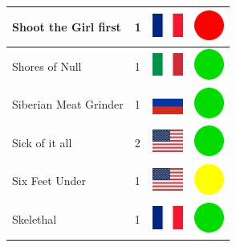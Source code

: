 \documentclass[12pt, a4paper, twoside]{report}
\begin{document}
\begin{center}
\begin{longtable}{|p{5cm}|p{2cm}|p{2cm}|p{2cm}|}
			Shoot the Girl first & 1 & \includegraphics[width=1cm]{4x3/fr} & \includegraphics[width=1cm]{likes/n} \\ \hline
			Shores of Null & 1 & \includegraphics[width=1cm]{4x3/it} & \includegraphics[width=1cm]{likes/y} \\ \hline
			Siberian Meat Grinder & 1 & \includegraphics[width=1cm]{4x3/ru} & \includegraphics[width=1cm]{likes/y} \\ \hline
			Sick of it all & 2 & \includegraphics[width=1cm]{4x3/us} & \includegraphics[width=1cm]{likes/y} \\ \hline
			Six Feet Under & 1 & \includegraphics[width=1cm]{4x3/us} & \includegraphics[width=1cm]{likes/m} \\ \hline
			Skelethal & 1 & \includegraphics[width=1cm]{4x3/fr} & \includegraphics[width=1cm]{likes/y} \\ \hline

\end{longtable}
\end{center}
\end{document}
